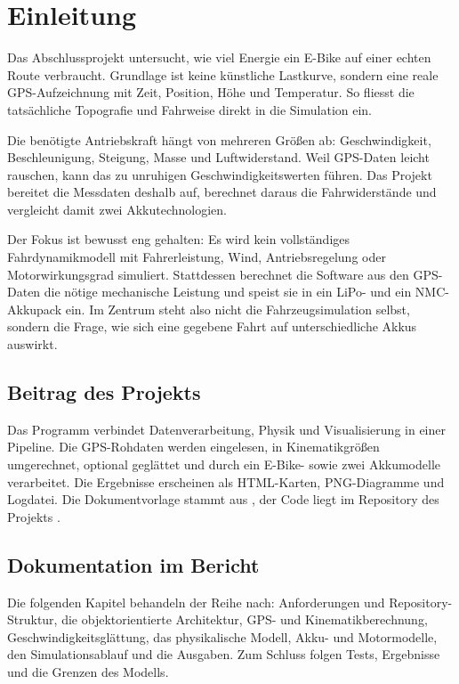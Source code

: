 \chapter{Einleitung}
\label{ch:einleitung}

Das Abschlussprojekt untersucht, wie viel Energie ein E-Bike auf einer echten Route verbraucht. Grundlage ist keine künstliche Lastkurve, sondern eine reale GPS-Aufzeichnung mit Zeit, Position, Höhe und Temperatur. So fliesst die tatsächliche Topografie und Fahrweise direkt in die Simulation ein.

Die benötigte Antriebskraft hängt von mehreren Größen ab: Geschwindigkeit, Beschleunigung, Steigung, Masse und Luftwiderstand. Weil GPS-Daten leicht rauschen, kann das zu unruhigen Geschwindigkeitswerten führen. Das Projekt bereitet die Messdaten deshalb auf, berechnet daraus die Fahrwiderstände und vergleicht damit zwei Akkutechnologien.

Der Fokus ist bewusst eng gehalten: Es wird kein vollständiges Fahrdynamikmodell mit Fahrerleistung, Wind, Antriebsregelung oder Motorwirkungsgrad simuliert. Stattdessen berechnet die Software aus den GPS-Daten die nötige mechanische Leistung und speist sie in ein LiPo- und ein NMC-Akkupack ein. Im Zentrum steht also nicht die Fahrzeugsimulation selbst, sondern die Frage, wie sich eine gegebene Fahrt auf unterschiedliche Akkus auswirkt.

\section{Beitrag des Projekts}

Das Programm verbindet Datenverarbeitung, Physik und Visualisierung in einer Pipeline. Die GPS-Rohdaten werden eingelesen, in Kinematikgrößen umgerechnet, optional geglättet und durch ein E-Bike- sowie zwei Akkumodelle verarbeitet. Die Ergebnisse erscheinen als HTML-Karten, PNG-Diagramme und Logdatei. Die Dokumentvorlage stammt aus \cite{mcidoc_template}, der Code liegt im Repository des Projekts \cite{abschlussprojekt_repo}.

\section{Dokumentation im Bericht}

Die folgenden Kapitel behandeln der Reihe nach: Anforderungen und Repository-Struktur, die objektorientierte Architektur, GPS- und Kinematikberechnung, Geschwindigkeitsglättung, das physikalische Modell, Akku- und Motormodelle, den Simulationsablauf und die Ausgaben. Zum Schluss folgen Tests, Ergebnisse und die Grenzen des Modells.

